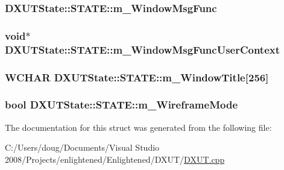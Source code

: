 \label{struct_d_x_u_t_state_1_1_s_t_a_t_e_a87749bb43ec8abb327a2db7f7353f792}
\hypertarget{struct_d_x_u_t_state_1_1_s_t_a_t_e_ac46ec283780560f0b7689489cc04783b}{
\subsubsection[{m\_\-WindowMsgFunc}]{ {\bf DXUTState::STATE::m\_\-WindowMsgFunc}}}
\label{struct_d_x_u_t_state_1_1_s_t_a_t_e_ac46ec283780560f0b7689489cc04783b}
\hypertarget{struct_d_x_u_t_state_1_1_s_t_a_t_e_ae847d206ac01990e7240ca915817a41f}{
\subsubsection[{m\_\-WindowMsgFuncUserContext}]{\setlength{\rightskip}{0pt plus 5cm}void$\ast$ {\bf DXUTState::STATE::m\_\-WindowMsgFuncUserContext}}}
\label{struct_d_x_u_t_state_1_1_s_t_a_t_e_ae847d206ac01990e7240ca915817a41f}
\hypertarget{struct_d_x_u_t_state_1_1_s_t_a_t_e_ad8779ed13105638022a10ba2e9810da9}{
\subsubsection[{m\_\-WindowTitle}]{\setlength{\rightskip}{0pt plus 5cm}WCHAR {\bf DXUTState::STATE::m\_\-WindowTitle}\mbox{[}256\mbox{]}}}
\label{struct_d_x_u_t_state_1_1_s_t_a_t_e_ad8779ed13105638022a10ba2e9810da9}
\hypertarget{struct_d_x_u_t_state_1_1_s_t_a_t_e_a0525b4dffa98dd3f8f6a13b59e8af4d8}{
\subsubsection[{m\_\-WireframeMode}]{\setlength{\rightskip}{0pt plus 5cm}bool {\bf DXUTState::STATE::m\_\-WireframeMode}}}
\label{struct_d_x_u_t_state_1_1_s_t_a_t_e_a0525b4dffa98dd3f8f6a13b59e8af4d8}


The documentation for this struct was generated from the following file:\begin{DoxyCompactItemize}
\item 
C:/Users/doug/Documents/Visual Studio 2008/Projects/enlightened/Enlightened/DXUT/\hyperlink{_d_x_u_t_8cpp}{DXUT.cpp}\end{DoxyCompactItemize}

